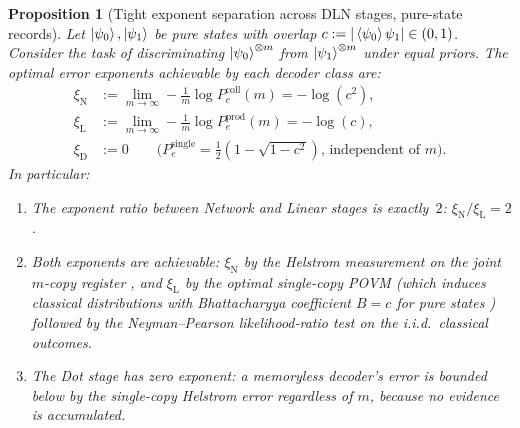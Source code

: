 \documentclass[11pt]{article}
\newcommand{\1}{\mathbf{1}}
\theoremstyle{definition}
\theoremstyle{plain}
\newtheorem{proposition}{Proposition}
\begin{document}
\begin{proposition}[Tight exponent separation across DLN stages, pure-state records]
\label{prop:tight-gap}
Let $\ket{\psi_0},\ket{\psi_1}$ be pure states with overlap
$c:=|\braket{\psi_0}{\psi_1}|\in(0,1)$.
Consider the task of discriminating $\ket{\psi_0}^{\otimes m}$ from
$\ket{\psi_1}^{\otimes m}$ under equal priors.
The optimal error exponents achievable by each decoder class are:
%
\begin{align}
  \xi_{\mathrm{N}}
    &:= \lim_{m\to\infty}
        -\tfrac{1}{m}\log P_e^{\mathrm{coll}}(m)
    = -\log(c^2),
  \label{eq:xi-N}\\[4pt]
  \xi_{\mathrm{L}}
    &:= \lim_{m\to\infty}
        -\tfrac{1}{m}\log P_e^{\mathrm{prod}}(m)
    = -\log(c),
  \label{eq:xi-L}\\[4pt]
  \xi_{\mathrm{D}}
    &:= 0\qquad
    \bigl(\text{$P_e^{\mathrm{single}}
    = \tfrac{1}{2}(1-\sqrt{1-c^2})$,
    independent of $m$}\bigr).
  \label{eq:xi-D}
\end{align}
%
In particular:
\begin{enumerate}[leftmargin=2em,label=(\alph*)]
\item The exponent ratio between Network and Linear stages is
      exactly~$2$:
      $\xi_{\mathrm{N}}/\xi_{\mathrm{L}} = 2$.
\item Both exponents are \emph{achievable}:
      $\xi_{\mathrm{N}}$ by the Helstrom measurement on the joint
      $m$-copy register \citep{Audenaert2007,NussbaumSzkola2009},
      and $\xi_{\mathrm{L}}$ by the optimal single-copy POVM
      (which induces classical distributions with Bhattacharyya
      coefficient $B=c$ for pure states \citep{FuchsCaves1994})
      followed by the Neyman--Pearson likelihood-ratio test on the
      i.i.d.\ classical outcomes.
\item The Dot stage has zero exponent: a memoryless decoder's error
      is bounded below by the single-copy Helstrom error regardless
      of $m$, because no evidence is accumulated.
\end{enumerate}
\end{proposition}
\end{document}
